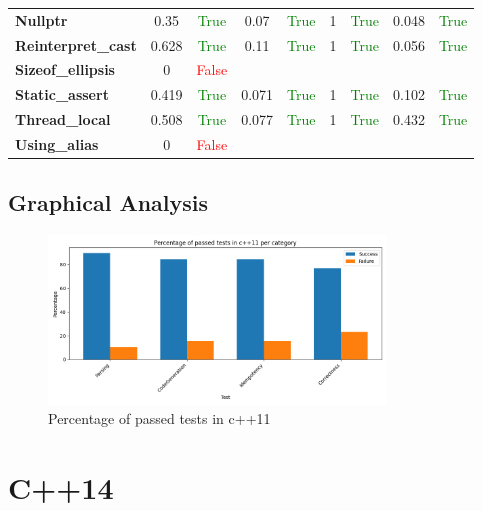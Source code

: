 \documentclass{article}
\begin{document}
\begin{xltabular}{\textwidth}{lcccccccc}
\textbf{{\fontsize{10}{12}\selectfont Nullptr}}& 0.35&\textcolor{green}{True}& 0.07&\textcolor{green}{True}& 1&\textcolor{green}{True}& 0.048&\textcolor{green}{True} \\[0.5ex]
\textbf{{\fontsize{10}{12}\selectfont Reinterpret\_cast}}& 0.628&\textcolor{green}{True}& 0.11&\textcolor{green}{True}& 1&\textcolor{green}{True}& 0.056&\textcolor{green}{True} \\[0.5ex]
\textbf{{\fontsize{10}{12}\selectfont Sizeof\_ellipsis}}& 0&\textcolor{red}{False} \\[0.5ex]
\textbf{{\fontsize{10}{12}\selectfont Static\_assert}}& 0.419&\textcolor{green}{True}& 0.071&\textcolor{green}{True}& 1&\textcolor{green}{True}& 0.102&\textcolor{green}{True} \\[0.5ex]
\textbf{{\fontsize{10}{12}\selectfont Thread\_local}}& 0.508&\textcolor{green}{True}& 0.077&\textcolor{green}{True}& 1&\textcolor{green}{True}& 0.432&\textcolor{green}{True} \\[0.5ex]
\textbf{{\fontsize{10}{12}\selectfont Using\_alias}}& 0&\textcolor{red}{False} \\[0.5ex]
\bottomrule
\end{xltabular}
\newpage
\subsection{Graphical Analysis}
\begin{figure}[h!]
\centering
\includegraphics[width=0.8\textwidth]{../reports/clava/images/c++11_percentage.png}
\caption{Percentage of passed tests in c++11}
\label{fig:c++11_percentage}
\end{figure}
\newpage
\section{C++14}
\end{document}
